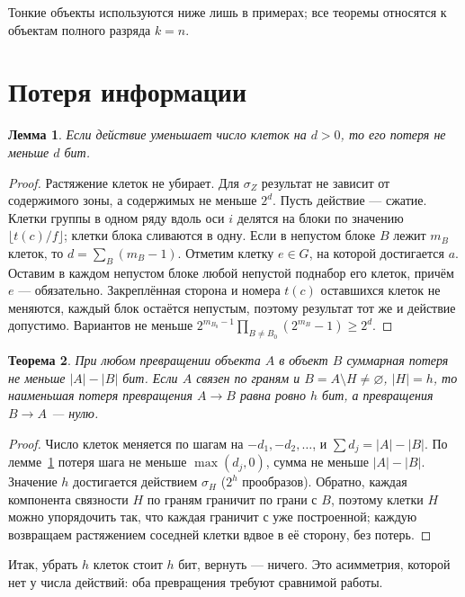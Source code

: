 \documentclass[11pt,a4paper]{article}
\theoremstyle{plain}
\newtheorem{theorem}{Теорема}
\newtheorem{lemma}[theorem]{Лемма}
\theoremstyle{definition}
\theoremstyle{remark}
\begin{document}
Тонкие объекты используются ниже лишь в примерах; все теоремы относятся к объектам полного разряда $k=n$.

\section{Потеря информации}\label{sec:loss}

\begin{lemma}\label{lem:bit}
Если действие уменьшает число клеток на $d>0$, то его потеря не меньше $d$ бит.
\end{lemma}
\begin{proof}
Растяжение клеток не убирает. Для $\sigma_Z$ результат не зависит от содержимого зоны, а содержимых не меньше $2^d$. Пусть действие — сжатие. Клетки группы в одном ряду вдоль оси $i$ делятся на блоки по значению $\lfloor t(c)/f\rfloor$; клетки блока сливаются в одну. Если в непустом блоке $B$ лежит $m_B$ клеток, то $d=\sum_B(m_B-1)$. Отметим клетку $e\in G$, на которой достигается $a$. Оставим в каждом непустом блоке любой непустой поднабор его клеток, причём $e$ — обязательно. Закреплённая сторона и номера $t(c)$ оставшихся клеток не меняются, каждый блок остаётся непустым, поэтому результат тот же и действие допустимо. Вариантов не меньше $2^{m_{B_0}-1}\prod_{B\ne B_0}(2^{m_B}-1)\ge 2^{d}$.
\end{proof}

\begin{theorem}\label{thm:loss}
При любом превращении объекта $A$ в объект $B$ суммарная потеря не меньше $|A|-|B|$ бит. Если $A$ связен по граням и $B=A\setminus H\neq\varnothing$, $|H|=h$, то наименьшая потеря превращения $A\to B$ равна ровно $h$ бит, а превращения $B\to A$ — нулю.
\end{theorem}
\begin{proof}
Число клеток меняется по шагам на $-d_1,-d_2,\dots$, и $\sum d_j=|A|-|B|$. По лемме~\ref{lem:bit} потеря шага не меньше $\max(d_j,0)$, сумма не меньше $|A|-|B|$. Значение $h$ достигается действием $\sigma_H$ ($2^h$ прообразов). Обратно, каждая компонента связности $H$ по граням граничит по грани с $B$, поэтому клетки $H$ можно упорядочить так, что каждая граничит с уже построенной; каждую возвращаем растяжением соседней клетки вдвое в её сторону, без потерь.
\end{proof}

Итак, убрать $h$ клеток стоит $h$ бит, вернуть — ничего. Это асимметрия, которой нет у числа действий: оба превращения требуют сравнимой работы.
\end{document}
